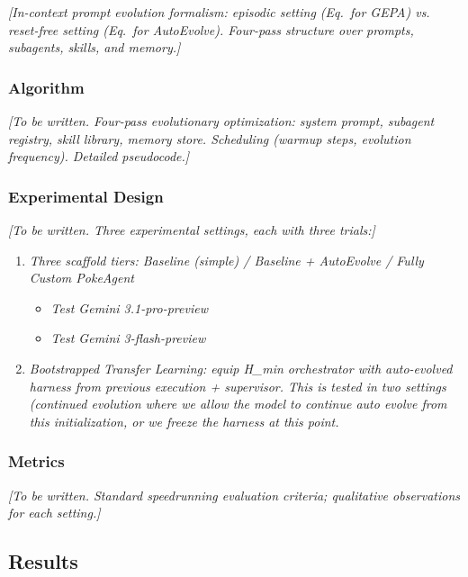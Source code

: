 \textit{[In-context prompt evolution formalism: episodic setting (Eq.~for GEPA) vs. reset-free setting (Eq.~for AutoEvolve). Four-pass structure over prompts, subagents, skills, and memory.]}

\subsubsection{Algorithm}\label{sec:algorithm}

\textit{[To be written. Four-pass evolutionary optimization: system prompt, subagent registry, skill library, memory store. Scheduling (warmup steps, evolution frequency). Detailed pseudocode.]}

\subsubsection{Experimental Design}\label{sec:experimental_design}

\textit{[To be written. Three experimental settings, each with three trials:]}

\begin{enumerate}
    \item \textit{Three scaffold tiers: Baseline (simple) / Baseline + AutoEvolve / Fully Custom PokeAgent}
    \begin{itemize}
        \item \textit{Test Gemini 3.1-pro-preview}
        \item \textit{Test Gemini 3-flash-preview}
    \end{itemize}
    \item \textit{Bootstrapped Transfer Learning: equip H_min orchestrator with auto-evolved harness from previous execution + supervisor. This is tested in two settings (continued evolution where we allow the model to continue auto evolve from this initialization, or we freeze the harness at this point.}
\end{enumerate}

\subsubsection{Metrics}\label{sec:autoevolve_metrics}

\textit{[To be written. Standard speedrunning evaluation criteria; qualitative observations for each setting.]}

\subsection{Results}\label{sec:results}

